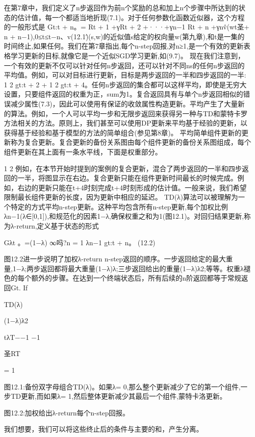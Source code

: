 在第7章中，我们定义了n步返回作为前n个奖励的总和加上n个步骤中所达到的状态的估计值，每一个都适当地折现(7.1)。对于任何参数化函数近似器，这个方程的一般形式是
Gt:t + n。= Rt + 1 +γRt + 2 +···+γn−1 Rt + n +γnv̂(wt圣+ n + n−1),0≤t≤t−n、v(12.1)̂(s,w)的近似值s给定的权向量w(第九章),和t是一集的时间终止,如果任何。我们在第7章指出,每个n-step回报,对n≥1,是一个有效的更新表格学习更新的目标,就像它是一个近似SGD学习更新,如(9.7)。
现在我们注意到，一个有效的更新不仅可以针对任何n步返回，还可以针对不同ns的任何n步返回的平均值。例如，可以对目标进行更新，目标是两步返回的一半和四步返回的一半:
1
2 gt:t + 2 +
1
2 gt:t + 4。任何n步返回的集合都可以这样平均，即使是无穷大
设置，只要组件返回的权重为正，sum为1。复合返回具有与单个n步返回相似的错误减少属性(7.3)，因此可以使用有保证的收敛属性构造更新。平均产生了大量新的算法。例如，一个人可以平均一步和无限步返回来获得另一种与TD和蒙特卡罗方法相关的方法。原则上，我们甚至可以使用DP更新来平均基于经验的更新，以获得基于经验和基于模型的方法的简单组合(参见第8章)。
平均简单组件更新的更新称为复合更新。复合更新的备份关系图由每个组件更新的备份关系图组成，每个组件更新在其上面有一条水平线，下面是权重部分。

1 2
例如，在本节开始时提到的案例的复合更新，混合了两步返回的一半和四步返回的一半，将图显示在右边。复合更新只能在组件更新时间最长的时候完成。例如，右边的更新只能在t+4时刻完成t+4时刻形成的估计值。一般来说，我们希望限制最长组件更新的长度，因为更新中相应的延迟。
TD(λ)算法可以被理解为一个特定的方式平均n-step更新。这种平均包含所有n-step更新,每个加权比例λn−1(λ∈[0,1]),和规范化的因素1−λ,确保权重之和为1(图12.1)。对回归结果更新,称为λ-return,定义基于状态的形式


Gλt
。=(1−λ)
∞吗?n = 1
λn−1 gt:t + n。 					(12.2)

图12.2进一步说明了加权λ-return n-step返回的顺序。一步返回给定的最大重量,1−λ;两步返回都将最大重量(1−λ)λ;三步返回给出的重量(1−λ)λ2;等等。权重λ褪色的每个额外的步骤。在达到一个终端状态后，所有后续的n阶返回都等于常规返回Gt. If


TD(λ)
 
(1−λ)λ2

tλT−−1
−1

圣RT

= 1


图12.1:备份双字母组合TD(λ)。如果λ= 0,那么整个更新减少了它的第一个组件,一步TD更新,而如果λ= 1,然后整体更新减少其最后一个组件,蒙特卡洛更新。


图12.2:加权给出λ-return每个n-step回报。

我们想要，我们可以将这些终止后的条件与主要的和，产生分离。


